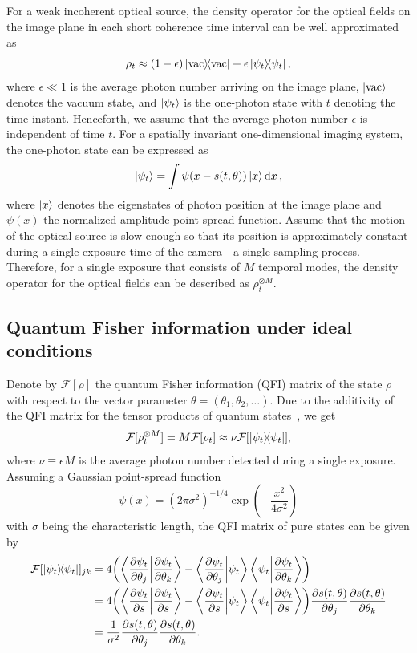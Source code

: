 \documentclass[aps,pra,10pt,showpacs,amsmath,amssymb,floatfix,superscriptaddress,twocolumn]{revtex4-2}
\begin{document}
For a weak incoherent optical source, the density operator for the optical fields on the image plane in each short coherence time interval can be well approximated as~\cite{supp_Tsang2016}
\begin{equation}
  \rho_t \approx (1-\epsilon) \op{\mathrm{vac}} + \epsilon \op{\psi_t},
\end{equation}
where \(\epsilon \ll 1\) is the average photon number arriving on the image plane, \(\ket{\mathrm{vac}}\) denotes the vacuum state, and \(\ket{\psi_t}\) is the one-photon state with \(t\) denoting the time instant.
Henceforth, we assume that the average photon number \(\epsilon\) is independent of time \(t\).
For a spatially invariant one-dimensional imaging system, the one-photon state can be expressed as
\begin{equation}
  \ket{\psi_t} = \int \psi(x-s(t, \theta)) \ket{x}\dd{x} ,
\end{equation}
where $\ket{x}$ denotes the eigenstates of photon position at the image plane and \(\psi(x)\) the normalized amplitude point-spread function.
Assume that the motion of the optical source is slow enough so that its position is approximately constant during a single exposure time of the camera---a single sampling process.
Therefore, for a single exposure that consists of \(M\) temporal modes, the density operator for the optical fields can be described as \(\rho_t^{\otimes M}\).


\subsection{Quantum Fisher information under ideal conditions}
Denote by \(\mathcal F[\rho]\) the quantum Fisher information (QFI) matrix of the state \(\rho\) with respect to the vector parameter \(\theta=(\theta_1, \theta_2, \ldots)\).
Due to the additivity of the QFI matrix for the tensor products of quantum states~\cite{supp_Liu2020}, we get
\begin{equation} \label{seq:QFIM1}
  \mathcal F[\rho_t^{\otimes M}]
  = M \mathcal F[\rho_t]
  \approx \nu \mathcal F[\op{\psi_t}],
\end{equation}
where \(\nu \equiv \epsilon M\) is the average photon number detected during a single exposure.
Assuming a Gaussian point-spread function
\begin{equation} \label{seq:psf}
  \psi(x)=(2\pi\sigma^{2})^{-1/4} \exp(-\frac{x^2}{4\sigma^2})
\end{equation}
with \(\sigma\) being the characteristic length, the QFI matrix of pure states can be given by
\begin{align}
  \mathcal F[\op{\psi_t}]_{jk} &= 4\qty(\ip{\pdv{\psi_t}{\theta_j}}{\pdv{\psi_t}{\theta_k}} - \ip{\pdv{\psi_t}{\theta_j}}{\psi_t}\ip{\psi_t}{\pdv{\psi_t}{\theta_k}}) \\
  &= 4\qty(\ip{\pdv{\psi_t}{s}} - \ip{\pdv{\psi_t}{s}}{\psi_t}\ip{\psi_t}{\pdv{\psi_t}{s}}) \pdv{s(t,\theta)}{\theta_j} \pdv{s(t, \theta)}{\theta_k} \\
  &= \frac1{\sigma^2} \pdv{s(t,\theta)}{\theta_j} \pdv{s(t, \theta)}{\theta_k}.\label{seq:QFIM2}
\end{align}
\end{document}
